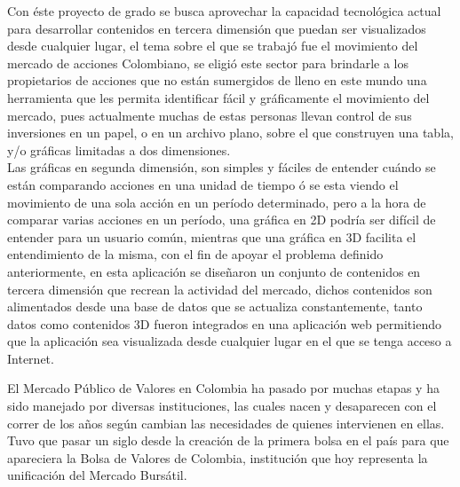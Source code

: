 \documentclass[twocolumn]{article}
\makeatletter
\def\section{\@startsection {section}{1}{\z@}{1.0ex plus 1ex minus
 .2ex}{.2ex plus .2ex}{\large\bf}}
\makeatother
\begin{document}
Con éste proyecto de grado se busca aprovechar la capacidad tecnológica actual para desarrollar contenidos en tercera dimensión que puedan ser visualizados desde cualquier lugar, el tema sobre el que se trabajó fue el movimiento del mercado de acciones Colombiano, se eligió este sector para brindarle a los propietarios de acciones que no están sumergidos de lleno en este mundo una herramienta que les permita identificar fácil y gráficamente el movimiento del mercado, pues actualmente muchas de estas personas llevan control de sus inversiones en un papel, o en un archivo plano, sobre el que construyen una tabla, y/o gráficas limitadas a dos dimensiones.\\
	
Las gráficas en segunda dimensión, son simples y fáciles de entender cuándo se están comparando acciones en una unidad de tiempo ó se esta viendo el movimiento de una sola acción en un período determinado, pero a la hora de comparar varias acciones en un período, una gráfica en 2D podría ser difícil de entender para un usuario común, mientras que una gráfica en 3D facilita el entendimiento de la misma, con el fin de apoyar el problema definido anteriormente, en esta aplicación se diseñaron un conjunto de contenidos en tercera dimensión que recrean la actividad del mercado, dichos contenidos son alimentados desde una base de datos que se actualiza constantemente, tanto datos como contenidos 3D fueron integrados en una aplicación web permitiendo que la aplicación sea visualizada desde cualquier lugar en el que se tenga acceso a Internet.\\

\vspace{8 mm}
\section{Sector beneficiado}
\vspace{5 mm}

El Mercado Público de Valores en Colombia ha pasado por muchas etapas y ha sido manejado por diversas instituciones, las cuales nacen y desaparecen con el correr de los años según cambian las necesidades de quienes intervienen en ellas. Tuvo que pasar un siglo desde la creación de la primera bolsa en el país para que apareciera la Bolsa de Valores de Colombia, institución que hoy representa la unificación del Mercado Bursátil.\cite{RePEc:col:000159:003891}\\
\end{document}
